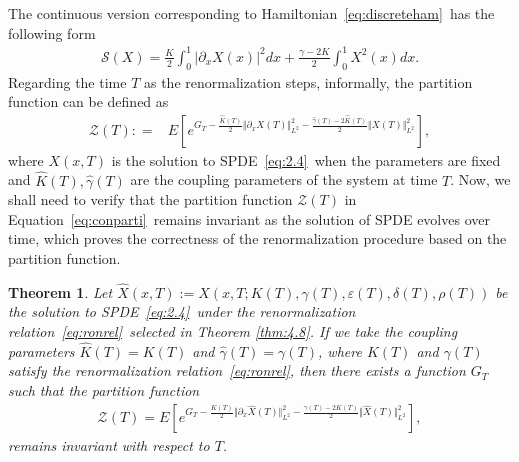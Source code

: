 \documentclass[11pt]{article}
\numberwithin{equation}{section}%
\numberwithin{figure}{section}%
\newtheorem{theorem}{Theorem}[section]
\theoremstyle{remark}
\begin{document}
	The continuous version corresponding to Hamiltonian~\eqref{eq:discreteham}~has the following form
	\begin{align*}
		\mathcal{S}(X)=\frac{K}{2}\int_{0}^{1} \left|\partial_{x} X(x)\right|^{2}dx+\frac{\gamma-2K}{2}\int_{0}^{1}X^{2}(x)dx.
	\end{align*}
	Regarding the time $T$ as the renormalization steps, informally, the partition function can be defined as
\begin{equation}\label{eq:conparti}
	\begin{split}
	\mathcal{Z}(T):
	=&E\left[e^{G_{T}-\frac{\hat{K}(T)}{2}\Vert \partial_{x} X(T)\Vert _{L^{2}}^{2}-\frac{\hat{\gamma}(T)-2\hat{K}(T)}{2}\Vert X(T)\Vert _{L^{2}}^{2}}\right],
	\end{split}
\end{equation}
where $X(x,T)$ is the solution to SPDE~\eqref{eq:2.4}~when the parameters are fixed and $\hat{K}(T),\hat{\gamma}(T)$ are the coupling parameters of the system at time $T$. Now, we shall need to verify that the partition function $\mathcal{Z}(T)$ in Equation~\eqref{eq:conparti}~remains invariant as the solution of SPDE evolves over time, which proves the correctness of the renormalization procedure based on the partition function.
	\begin{theorem}\label{thm:6.1}
		Let $\hat{X}(x,T):=X(x,T;K(T),\gamma(T),\varepsilon(T),\delta(T),\rho(T))$ be the solution to SPDE~\eqref{eq:2.4}~under the renormalization relation~\eqref{eq:ronrel}~selected in Theorem \ref{thm:4.8}. If we take the coupling parameters $\hat{K}(T)=K(T)$ and $\hat{\gamma}(T)=\gamma(T)$, where $K(T)$ and $\gamma(T)$ satisfy the renormalization relation~\eqref{eq:ronrel}, then there exists a function $G_{T}$ such that the partition function 
		\begin{align*}
			\mathcal{Z}(T)=E[e^{G_{T}-\frac{K(T)}{2}\Vert \partial_{x} \hat{X}(T)\Vert _{L^{2}}^{2}-\frac{\gamma(T)-2K(T)}{2}\Vert \hat{X}(T)\Vert _{L^{2}}^{2}}],
		\end{align*}
		remains invariant with respect to $T$. 
	\end{theorem}
\end{document}
